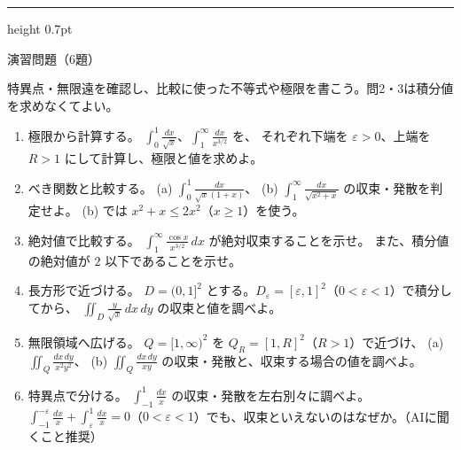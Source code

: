 \documentclass[a4paper,10pt,pdflatex,ja=standard,jafont=ipaex-type1,
  magstyle=real,scale=1]{bxjsarticle}
\newcommand{\topic}[1]{\par\vspace{5pt}%
  {\large\sffamily\mdseries\color{accent}#1}\par\vspace{2pt}}
\newenvironment{problems}
  {\begin{enumerate}[leftmargin=2em,itemsep=3pt,topsep=3pt,parsep=0pt,
    font=\color{accent}]}
  {\end{enumerate}}
\newcommand{\examplelabel}[1]{{\sffamily\mdseries\color{ink}#1}}
\newcommand{\problemspace}{\par\vspace{5mm}}
\newcommand{\exercises}{%
  {\color{accent}\hrule height 0.7pt}\vspace{3pt}%
  \topic{演習問題（6題）}%
  {\small 特異点・無限遠を確認し、比較に使った不等式や極限を書こう。問2・3は積分値を求めなくてよい。}\par}
\begin{document}
\noindent\begin{minipage}[b][0.5\textheight][t]{\linewidth}
\exercises
\begin{problems}
\item \examplelabel{極限から計算する。}
$\displaystyle\int_0^1\frac{dx}{\sqrt{x}}$、$\displaystyle\int_1^\infty\frac{dx}{x^{3/2}}$ を、
それぞれ下端を $\varepsilon>0$、上端を $R>1$ にして計算し、極限と値を求めよ。
\problemspace

\item \examplelabel{べき関数と比較する。}
(a) $\displaystyle\int_0^1\frac{dx}{\sqrt{x}(1+x)}$、
(b) $\displaystyle\int_1^\infty\frac{dx}{\sqrt{x^2+x}}$ の収束・発散を判定せよ。
(b) では $x^2+x\le2x^2$（$x\ge1$）を使う。
\problemspace

\item \examplelabel{絶対値で比較する。}
$\displaystyle\int_1^\infty\frac{\cos x}{x^{3/2}}\,dx$ が絶対収束することを示せ。
また、積分値の絶対値が $2$ 以下であることを示せ。
\problemspace


\item \examplelabel{長方形で近づける。}
$D=(0,1]^2$ とする。$D_\varepsilon=[\varepsilon,1]^2$（$0<\varepsilon<1$）で積分してから、
$\displaystyle\iint_D\frac{y}{\sqrt{x}}\,dx\,dy$ の収束と値を調べよ。
\problemspace

\item \examplelabel{無限領域へ広げる。}
$Q=[1,\infty)^2$ を $Q_R=[1,R]^2$（$R>1$）で近づけ、
(a) $\displaystyle\iint_Q\frac{dx\,dy}{x^2y^2}$、
(b) $\displaystyle\iint_Q\frac{dx\,dy}{xy}$ の収束・発散と、収束する場合の値を調べよ。
\problemspace
\item \examplelabel{特異点で分ける。}
$\displaystyle\int_{-1}^1\frac{dx}{x}$ の収束・発散を左右別々に調べよ。
$\displaystyle\int_{-1}^{-\varepsilon}\frac{dx}{x}+\int_\varepsilon^1\frac{dx}{x}=0$（$0<\varepsilon<1$）でも、収束といえないのはなぜか。（AIに聞くこと推奨）
\problemspace

\end{problems}
\end{minipage}
\end{document}
